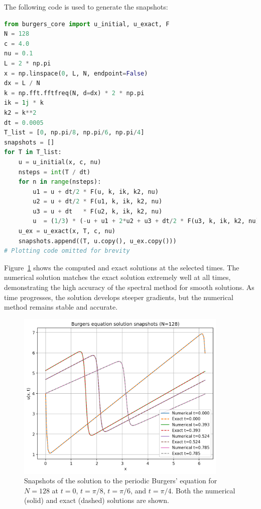 \documentclass{article}
\begin{document}
The following code is used to generate the snapshots:

\begin{lstlisting}[language=Python]
from burgers_core import u_initial, u_exact, F
N = 128
c = 4.0
nu = 0.1
L = 2 * np.pi
x = np.linspace(0, L, N, endpoint=False)
dx = L / N
k = np.fft.fftfreq(N, d=dx) * 2 * np.pi
ik = 1j * k
k2 = k**2
dt = 0.0005
T_list = [0, np.pi/8, np.pi/6, np.pi/4]
snapshots = []
for T in T_list:
    u = u_initial(x, c, nu)
    nsteps = int(T / dt)
    for n in range(nsteps):
        u1 = u + dt/2 * F(u, k, ik, k2, nu)
        u2 = u + dt/2 * F(u1, k, ik, k2, nu)
        u3 = u + dt   * F(u2, k, ik, k2, nu)
        u  = (1/3) * (-u + u1 + 2*u2 + u3 + dt/2 * F(u3, k, ik, k2, nu))
    u_ex = u_exact(x, T, c, nu)
    snapshots.append((T, u.copy(), u_ex.copy()))
# Plotting code omitted for brevity
\end{lstlisting}

Figure~\ref{fig:burgers_snapshots} shows the computed and exact solutions at the selected times. The numerical solution matches the exact solution extremely well at all times, demonstrating the high accuracy of the spectral method for smooth solutions. As time progresses, the solution develops steeper gradients, but the numerical method remains stable and accurate.

\begin{figure}[htbp]
    \centering
    \includegraphics[width=0.9\textwidth]{figure/burgers_snapshots.png}
    \caption{Snapshots of the solution to the periodic Burgers' equation for $N=128$ at $t=0$, $t=\pi/8$, $t=\pi/6$, and $t=\pi/4$. Both the numerical (solid) and exact (dashed) solutions are shown.}
    \label{fig:burgers_snapshots}
\end{figure}
\end{document}

